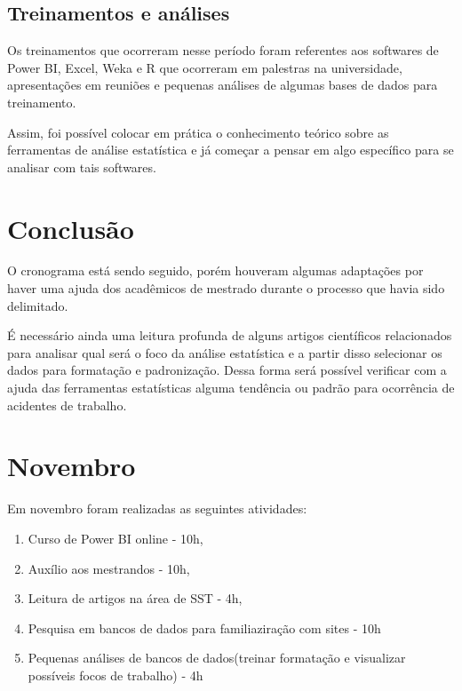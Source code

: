 \documentclass{article}
\begin{document}
\subsection{Treinamentos e análises}

Os treinamentos que ocorreram nesse período foram referentes aos softwares de Power BI, Excel, Weka e R que ocorreram em palestras na universidade, apresentações em reuniões e pequenas análises de algumas bases de dados para treinamento. 

Assim, foi possível colocar em prática o conhecimento teórico sobre as ferramentas de análise estatística e já começar a pensar em algo específico para se analisar com tais softwares.

\section{Conclusão}

O cronograma está sendo seguido, porém houveram algumas adaptações por haver uma ajuda dos acadêmicos de mestrado durante o processo que havia sido delimitado. 

É necessário ainda uma leitura profunda de alguns artigos científicos relacionados para analisar qual será o foco da análise estatística e a partir disso selecionar os dados para formatação e padronização. Dessa forma será possível verificar com a ajuda das ferramentas estatísticas alguma tendência ou padrão para ocorrência de acidentes de trabalho.

\newpage
\section*{Novembro}

Em novembro foram realizadas as seguintes atividades:

\begin{enumerate}[1)]

\item Curso de Power BI online - 10h, 
\item Auxílio aos mestrandos - 10h, 
\item Leitura de artigos na área de SST - 4h,
\item Pesquisa em bancos de dados para familiaziração com sites - 10h
\item Pequenas análises de bancos de dados(treinar formatação e visualizar possíveis focos de trabalho) - 4h

\end{enumerate}

\end{document}
